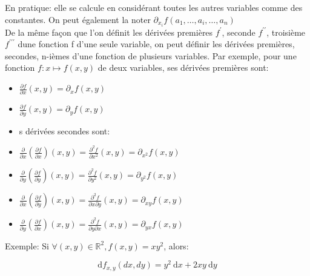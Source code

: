 En pratique: elle se calcule en considérant toutes les autres variables comme des constantes. On peut également la noter $\partial_{x_i} f\left(a_1, \ldots, a_i, \ldots, a_n\right)$\\

De la même façon que l'on définit les dérivées premières $f^{\prime}$, seconde $f^{\prime \prime}$, troisième $f^{\prime \prime \prime}$ dune fonction f d'une seule variable, on peut définir les dérivées premières, secondes, n-ièmes d'une fonction de plusieurs variables. Par exemple, pour une fonction $f: x \mapsto f(x, y)$ de deux variables, ses dérivées premières sont:

\begin{itemize}
    \item $\frac{\partial f}{\partial x}(x, y)=\partial_x f(x, y)$
    \item $\frac{\partial f}{\partial y}(x, y)=\partial_y f(x, y)$
    \item s dérivées secondes sont:
    \item $\frac{\partial}{\partial x}\left(\frac{\partial f}{\partial x}\right)(x, y)=\frac{\partial^2 f}{\partial x^2}(x, y)=\partial_{x^2} f(x, y)$
    \item $\frac{\partial}{\partial y}\left(\frac{\partial f}{\partial y}\right)(x, y)=\frac{\partial^2 f}{\partial y^2}(x, y)=\partial_{y^2} f(x, y)$
    \item $\frac{\partial}{\partial x}\left(\frac{\partial f}{\partial y}\right)(x, y)=\frac{\partial^2 f}{\partial x \partial y}(x, y)=\partial_{x y} f(x, y)$
    \item $\frac{\partial}{\partial y}\left(\frac{\partial f}{\partial x}\right)(x, y)=\frac{\partial^2 f}{\partial y \partial x}(x, y)=\partial_{y x} f(x, y)$
\end{itemize}




Exemple: Si $\forall(x, y) \in \mathbb{R}^2, f(x, y)=x y^2$, alors:

$$
\mathrm{d} f_{x, y}(d x, d y)=y^2 \mathrm{~d} x+2 x y \mathrm{~d} y
$$

